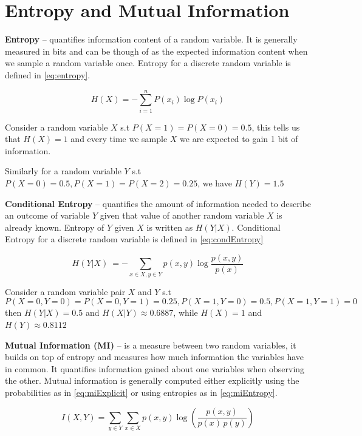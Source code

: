 \section{Entropy and Mutual Information}

\textbf{Entropy} -- quantifies information content of a random variable. It is
generally measured in bits and can be though of as the expected information
content when we sample a random variable once. Entropy for a discrete random
variable is defined in \autoref{eq:entropy}.

\begin{equation}
  H(X)=-\sum _{i=1}^{n}{P (x_{i})\log P(x_{i})}
\label{eq:entropy}
\end{equation}

Consider a random variable $X$ s.t $P(X=1) = P(X=0) = 0.5$, this tells
us that $H(X) = 1$ and every time we sample $X$ we are expected to gain 1 bit of
information.

Similarly for a random variable $Y$ s.t $P(X=0) = 0.5, P(X=1) = P(X=2) = 0.25$,
we have $H(Y) = 1.5$

\textbf{Conditional Entropy} -- quantifies the amount of information needed to
describe an outcome of variable $Y$ given that value of another random variable
$X$ is already known. Entropy of $Y$ given $X$ is written as $H(Y|X)$.
Conditional Entropy for a discrete random variable is defined in
\autoref{eq:condEntropy}

\begin{equation}
H(Y|X)\ =-\sum _{x\in {X},y\in {Y}}p(x,y)\log {\frac {p(x,y)}{p(x)}}
\label{eq:condEntropy}
\end{equation}

Consider a random variable pair $X$ and $Y$ s.t 
$$P(X=0,Y=0) = P(X=0,Y=1) = 0.25, P(X=1,Y=0) = 0.5, P(X=1,Y=1) = 0$$
then $H(Y|X) = 0.5$ and $H(X|Y) \approx 0.6887$, while $H(X) = 1$ and $H(Y)
\approx 0.8112$

\textbf{Mutual Information (MI)} -- is a measure between two random variables,
it builds on top of entropy and measures how much information the variables have
in common. It quantifies information gained about one variables when observing
the other. Mutual information is generally computed either explicitly using the
probabilities as in \autoref{eq:miExplicit} or using entropies as in
\autoref{eq:miEntropy}.

\begin{equation}
      I(X,Y)=\sum _{y\in Y}\sum _{x\in X}{p(x,y)\log {\left({\frac
      {p(x,y)}{p(x)\,p(y)}}\right)}} 
\label{eq:miExplicit}
\end{equation}

